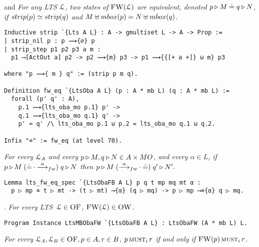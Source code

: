\noindent
{} and \emph{
For any LTS $\mathcal{L}$,
two states of $\textsc{FW}(\mathcal{L})$ are equivalent, denoted
$p \triangleright M \doteq q \triangleright N$, if
$ \strip{ \serverA } \simeq \strip{ \serverB }$
and $M \uplus \outputmultiset{\serverA} = N \uplus \outputmultiset{\serverB}$.
}

\begin{mdframed}
\begin{verbatim}
Inductive strip `{Lts A L} : A -> gmultiset L -> A -> Prop :=
| strip_nil p : p ⟿{∅} p
| strip_step p1 p2 p3 a m :
  p1 ⟶[ActOut a] p2 -> p2 ⟿{m} p3 -> p1 ⟿{{[+ a +]} ⊎ m} p3

where "p ⟿{ m } q" := (strip p m q).

Definition fw_eq `{LtsOba A L} (p : A * mb L) (q : A * mb L) :=
  forall (p' q' : A),
    p.1 ⟿{lts_oba_mo p.1} p' ->
    q.1 ⟿{lts_oba_mo q.1} q' ->
    p' ⋍ q' /\ lts_oba_mo p.1 ⊎ p.2 = lts_oba_mo q.1 ⊎ q.2.

Infix "≐" := fw_eq (at level 70).
\end{verbatim}
\end{mdframed}

\noindent
{}\emph{
For every $\mathcal{L}_A$ and every
$p \triangleright M, q \triangleright N \in A \times MO$,
and every $\alpha \in L$, if
$
\serverA \triangleright M \mathrel{({\doteq} \cdot {\sta{\alpha}})}
\serverB \triangleright N
$ then
$
\serverA  \triangleright M \mathrel{({\sta{\alpha}} \cdot {\doteq})} \serverB' \triangleright N'.
$
}

\begin{mdframed}
\begin{verbatim}
Lemma lts_fw_eq_spec `{LtsObaFB A L} p q t mp mq mt α :
  p ▷ mp ≐ t ▷ mt -> (t ▷ mt) ⟶{α} (q ▷ mq) -> p ▷ mp ⟶≐{α} q ▷ mq.
\end{verbatim}
\end{mdframed}

\noindent
{}. \emph{For every LTS~$\mathcal{L} \in \textsc{OF}$, $\textsc{FW}(\mathcal{L})
\in \textsc{OW}$.}

\begin{mdframed}
\begin{verbatim}
Program Instance LtsMBObaFW `{LtsObaFB A L} : LtsObaFW (A * mb L) L.
\end{verbatim}
\end{mdframed}


\noindent
{}\emph{
For every $\mathcal{L}_A, \mathcal{L}_B \in \textsc{OF}, p \in A, r \in B$,
$p \operatorname{\textsc{must}}_i r$ if and only if $\textsc{FW}(p) \operatorname{\textsc{must}}_i r$.
}

